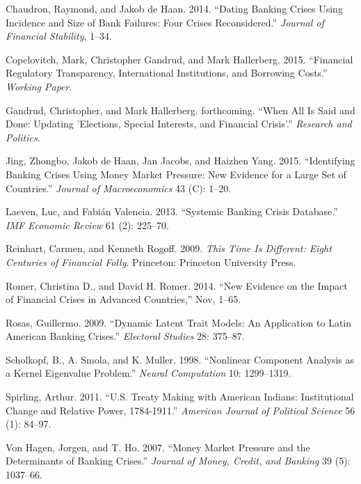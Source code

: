 \documentclass[]{article}
\begin{document}
Chaudron, Raymond, and Jakob de Haan. 2014. ``Dating Banking Crises
Using Incidence and Size of Bank Failures: Four Crises Reconsidered.''
\emph{Journal of Financial Stability}, 1--34.

Copelovitch, Mark, Christopher Gandrud, and Mark Hallerberg. 2015.
``Financial Regulatory Transparency, International Institutions, and
Borrowing Costs.'' \emph{Working Paper}.

Gandrud, Christopher, and Mark Hallerberg. forthcoming. ``When All Is
Said and Done: Updating 'Elections, Special Interests, and Financial
Crisis'.'' \emph{Research and Politics}.

Jing, Zhongbo, Jakob de Haan, Jan Jacobs, and Haizhen Yang. 2015.
``Identifying Banking Crises Using Money Market Pressure: New Evidence
for a Large Set of Countries.'' \emph{Journal of Macroeconomics} 43 (C):
1--20.

Laeven, Luc, and Fabi{á}n Valencia. 2013. ``Systemic Banking Crisis
Database.'' \emph{IMF Economic Review} 61 (2): 225--70.

Reinhart, Carmen, and Kenneth Rogoff. 2009. \emph{This Time Is
Different: Eight Centuries of Financial Folly}. Princeton: Princeton
University Press.

Romer, {Christina D.}, and {David H.} Romer. 2014. ``New Evidence on the
Impact of Financial Crises in Advanced Countries,'' Nov, 1--65.

Rosas, Guillermo. 2009. ``Dynamic Latent Trait Models: An Application to
Latin American Banking Crises.'' \emph{Electoral Studies} 28: 375--87.

Scholkopf, B., A. Smola, and K. Muller. 1998. ``Nonlinear Component
Analysis as a Kernel Eigenvalue Problem.'' \emph{Neural Computation} 10:
1299--1319.

Spirling, Arthur. 2011. ``U.S. Treaty Making with American Indians:
Institutional Change and Relative Power, 1784-1911.'' \emph{American
Journal of Political Science} 56 (1): 84--97.

{Von Hagen}, Jorgen, and T. Ho. 2007. ``Money Market Pressure and the
Determinants of Banking Crises.'' \emph{Journal of Money, Credit, and
Banking} 39 (5): 1037--66.
\end{document}
